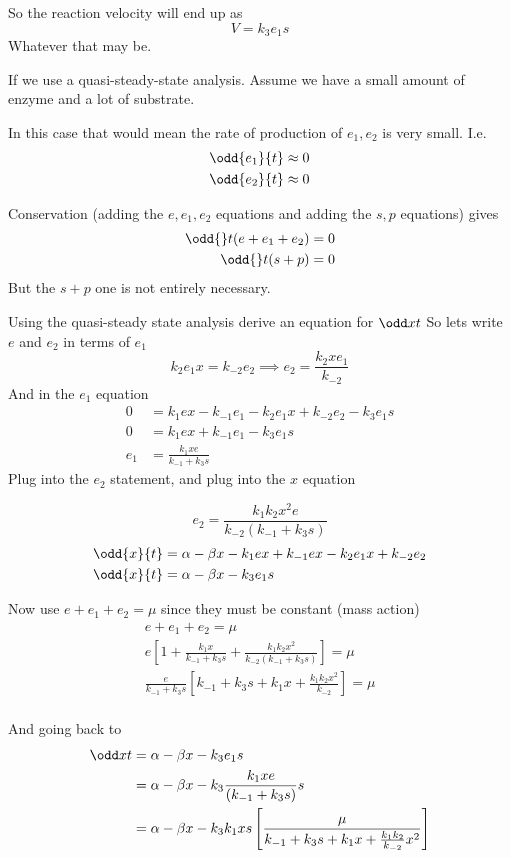 \documentclass{X:/Documents/Coding/Latex/myassignment}
\begin{document}
So the reaction velocity will end up as
\[V = k_3 e_1 s\]
Whatever that may be.

If we use a quasi-steady-state analysis. Assume we have a small amount of enzyme and a lot of substrate.

In this case that would mean the rate of production of $e_1,e_2$ is very small. I.e. 
\begin{align*}
	\odd{e_1}{t} \approx 0\\
	\odd{e_2}{t} \approx 0\\
\end{align*}

Conservation (adding the $e,e_1,e_2$ equations and adding the $s,p$ equations) gives
\begin{align*}
	\odd{}t (e+e_1 + e_2) =0\\
	\odd{}t (s + p) = 0
\end{align*}
But the $s+p$ one is not entirely necessary.

Using the quasi-steady state analysis derive an equation for $\odd xt$
So lets write $e$ and $e_2$ in terms of $e_1$
\[k_2 e_1 x = k_{-2} e_2 \implies e_2 = \frac{k_2 x e_1}{k_{-2}}\]
And in the $e_1$ equation
\begin{align*}
	0 &=k_1 e x - k_{-1} e_1 - k_2 e_1 x + k_{-2} e_2 - k_3 e_1 s\\
	0 &=k_1 e x + k_{-1} e_1 - k_3 e_1 s\\
	e_1 &= \frac{k_1 x e}{k_{-1} + k_3 s}
\end{align*}
Plug into the $e_2$ statement, and plug into the $x$ equation

\[e_2 = \frac{k_1k_2 x^2 e}{k_{-2}(k_{-1} + k_3 s)}\]
\begin{align*}
 	\odd{x}{t} &= \alpha - \beta x - k_1 e x + k_{-1}e x - k_2 e_1 x + k_{-2} e_2\\
 	\odd{x}{t} &= \alpha  - \beta x - k_3 e_1 s 
\end{align*}


Now use $e + e_1 + e_2 = \mu$ since they must be constant (mass action)
\begin{align*}
	e + e_1 + e_2 = \mu\\
	e \left[1 + \frac{k_1x}{k_{-1} + k_3 s} + \frac{k_1 k_2 x^2}{k_{-2} (k_{-1} +k_3s)}\right] = \mu\\
	\frac{e}{k_{-1} + k_3 s} \left[ k_{-1} + k_3s + k_1x + \frac{k_1 k_2 x^2}{k_{-2}} \right] = \mu\\
\end{align*}

And going back to 
\begin{align*}
	\odd xt &= \alpha - \beta x - k_3 e_1 s\\
	&=\alpha - \beta x - k_3 \frac{k_1 x e}{(k_{-1} + k_3 s)} s\\
	&=\alpha - \beta x - k_3 k_1 x s \left[\frac{\mu }{k_{-1} + k_3 s + k_1 x + \frac{k_1 k_2}{k_{-2}} x^2}\right]\\
\end{align*}
\end{document}
